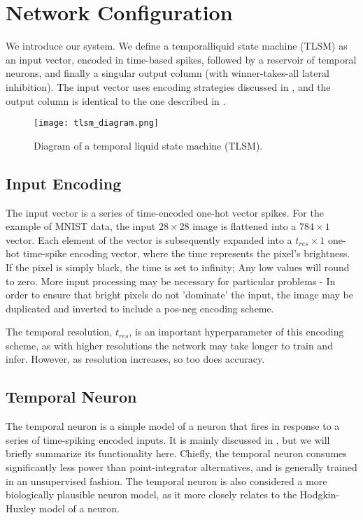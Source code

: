 \section{Network Configuration} \label{sec:Network Configuration}

We introduce our system. We define a temporalliquid state machine (TLSM) as an
input vector, encoded in time-based spikes, followed by a reservoir of temporal
neurons, and finally a singular output column (with winner-takes-all lateral
inhibition). The input vector uses encoding strategies discussed in
\cite{Encoding}, and the output column is identical to the one described in
\cite{TNN}.

\begin{figure}[h]
    \centering
    \texttt{[image: tlsm\_diagram.png]}
    \caption{Diagram of a temporal liquid state machine (TLSM).}
    \label{fig:tlsm_diagram}
\end{figure}

\subsection{Input Encoding}

The input vector is a series of time-encoded one-hot vector spikes. For the
example of MNIST data, the input $28 \times 28$ image is flattened into a
$784 \times 1$ vector. Each element of the vector is subsequently expanded into
a $t_{res} \times 1$ one-hot time-spike encoding vector, where the time
represents the pixel's brightness. If the pixel is simply black, the time is
set to infinity; Any low values will round to zero. More input processing may
be necessary for particular problems - In order to ensure that bright pixels do
not 'dominate' the input, the image may be duplicated and inverted to include a
pos-neg encoding scheme.

The temporal resolution, $t_{res}$, is an important hyperparameter of this
encoding scheme, as with higher resolutions the network may take longer to train
and infer. However, as resolution increases, so too does accuracy.

\subsection{Temporal Neuron}

The temporal neuron is a simple model of a neuron that fires in response to a
series of time-spiking encoded inputs. It is mainly discussed in \cite{TNN}, but
we will briefly summarize its functionality here. Chiefly, the temporal neuron
consumes significantly less power than point-integrator alternatives, and is
generally trained in an unsupervised fashion. The temporal neuron is also
considered a more biologically plausible neuron model, as it more closely
relates to the Hodgkin-Huxley model \cite{Hodgkin-Huxley} of a neuron.

